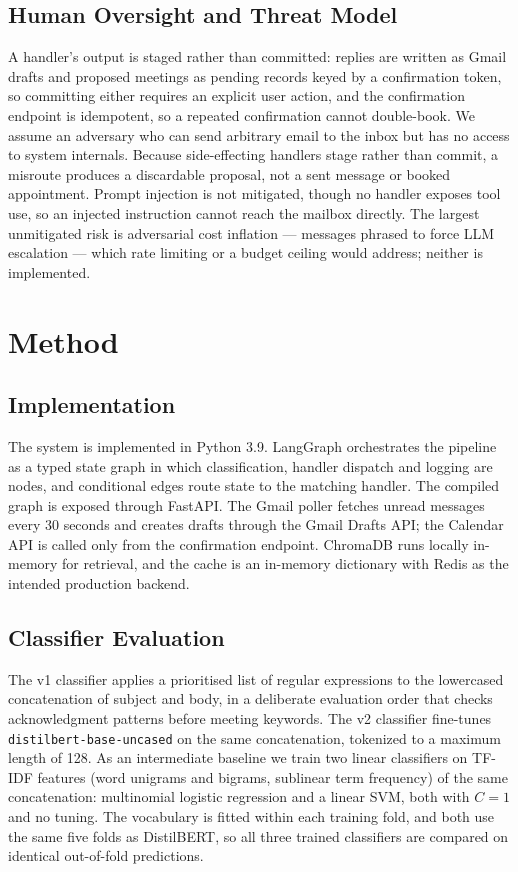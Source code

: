 \documentclass[conference]{IEEEtran}
\begin{document}
\subsection{Human Oversight and Threat Model}
A handler's output is staged rather than committed: replies are written as Gmail drafts and proposed meetings as pending records keyed by a confirmation token, so committing either requires an explicit user action, and the confirmation endpoint is idempotent, so a repeated confirmation cannot double-book. We assume an adversary who can send arbitrary email to the inbox but has no access to system internals. Because side-effecting handlers stage rather than commit, a misroute produces a discardable proposal, not a sent message or booked appointment. Prompt injection is not mitigated, though no handler exposes tool use, so an injected instruction cannot reach the mailbox directly. The largest unmitigated risk is adversarial cost inflation --- messages phrased to force LLM escalation --- which rate limiting or a budget ceiling would address; neither is implemented.

\section{Method}

\subsection{Implementation}
The system is implemented in Python 3.9. LangGraph \cite{b8} orchestrates the pipeline as a typed state graph in which classification, handler dispatch and logging are nodes, and conditional edges route state to the matching handler. The compiled graph is exposed through FastAPI. The Gmail poller fetches unread messages every 30 seconds and creates drafts through the Gmail Drafts API; the Calendar API is called only from the confirmation endpoint. ChromaDB runs locally in-memory for retrieval, and the cache is an in-memory dictionary with Redis as the intended production backend.

\subsection{Classifier Evaluation}
The v1 classifier applies a prioritised list of regular expressions to the lowercased concatenation of subject and body, in a deliberate evaluation order that checks acknowledgment patterns before meeting keywords. The v2 classifier fine-tunes \texttt{distilbert-base-uncased} \cite{b9} on the same concatenation, tokenized to a maximum length of 128. As an intermediate baseline we train two linear classifiers on TF-IDF
features (word unigrams and bigrams, sublinear term frequency) of the same
concatenation: multinomial logistic regression and a linear SVM, both with
$C{=}1$ and no tuning. The vocabulary is fitted within each training fold,
and both use the same five folds as DistilBERT, so all three trained
classifiers are compared on identical out-of-fold predictions.
\end{document}
